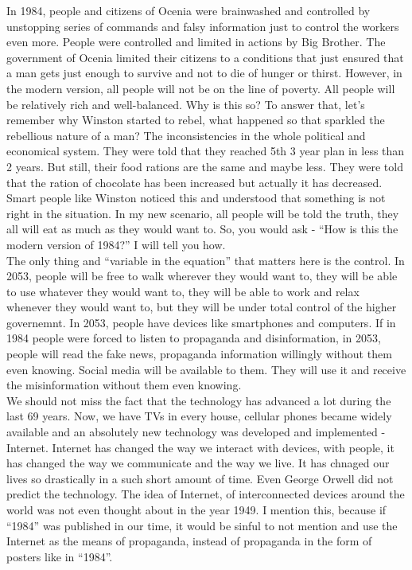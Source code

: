 \documentclass[a4paper,12pt]{article}
\begin{document}
In 1984, people and citizens of Ocenia were brainwashed and controlled by unstopping series of commands and falsy information just to control the workers even more. People were controlled and limited in actions by Big Brother. The government of Ocenia limited their citizens to a conditions that just ensured that a man gets just enough to survive and not to die of hunger or thirst. However, in the modern version, all people will not be on the line of poverty. All people will be relatively rich and well-balanced. Why is this so? To answer that, let's remember why Winston started to rebel, what happened so that sparkled the rebellious nature of a man? The inconsistencies in the whole political and economical system. They were told that they reached 5th 3 year plan in less than 2 years. But still, their food rations are the same and maybe less. They were told that the ration of chocolate has been increased but actually it has decreased. Smart people like Winston noticed this and understood that something is not right in the situation. In my new scenario, all people will be told the truth, they all will eat as much as they would want to. So, you would ask - ``How is this the modern version of 1984?'' I will tell you how.\\

The only thing and ``variable in the equation'' that matters here is the control. In 2053, people will be free to walk wherever they would want to, they will be able to use whatever they would want to, they will be able to work and relax whenever they would want to, but they will be under total control of the higher governemnt. In 2053, people have devices like smartphones and computers. If in 1984 people were forced to listen to propaganda and disinformation, in 2053, people will read the fake news, propaganda information willingly without them even knowing. Social media will be available to them. They will use it and receive the misinformation without them even knowing.\\


We should not miss the fact that the technology has advanced a lot during the last 69 years. Now, we have TVs in every house, cellular phones became widely available and an absolutely new technology was developed and implemented - Internet. Internet has changed the way we interact with devices, with people, it has changed the way we communicate and the way we live. It has chnaged our lives so drastically in a such short amount of time. Even George Orwell did not predict the technology. The idea of Internet, of interconnected devices around the world was not even thought about in the year 1949. I mention this, because if ``1984'' was published in our time, it would be sinful to not mention and use the Internet as the means of propaganda, instead of propaganda in the form of posters like in ``1984''.\\


\newpage


\end{document}

